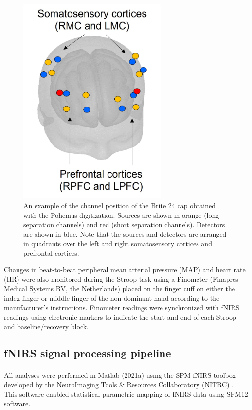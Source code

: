 \documentclass[12pt]{spieman}  %
\begin{document}
\begin{spacing}{2}
\begin{figure}
\begin{center}
\includegraphics[width = 75mm]{Fig7_channelPosition.jpg}
\end{center}
\caption 
{\label{fig:channelPosition} An example of the channel position of the Brite 24 cap obtained with the Pohemus digitization. Sources are shown in orange (long separation channels) and red (short separation channels). Detectors are shown in blue. Note that the sources and detectors are arranged in quadrants over the left and right somatosensory cortices and prefrontal cortices.} 
\end{figure} 

Changes in beat-to-beat peripheral mean arterial pressure (MAP) and heart rate (HR) were also monitored during the Stroop task using a Finometer (Finapres Medical Systems BV, the Netherlands) placed on the finger cuff on either the index finger or middle finger of the non-dominant hand  according to the manufacturer's instructions. Finometer readings were synchronized with fNIRS readings using electronic markers to indicate the start and end of each Stroop and baseline/recovery block. 


\subsection{fNIRS signal processing pipeline} \label{sec:preprocessing}
All analyses were performed in Matlab\textsuperscript{\textregistered} (2021a) using the SPM-fNIRS toolbox developed by the NeuroImaging Tools \& Resources Collaboratory (NITRC) \cite{Tak2016}. This software enabled statistical parametric mapping of fNIRS data using SPM12 software.


\end{spacing}
\end{document}
